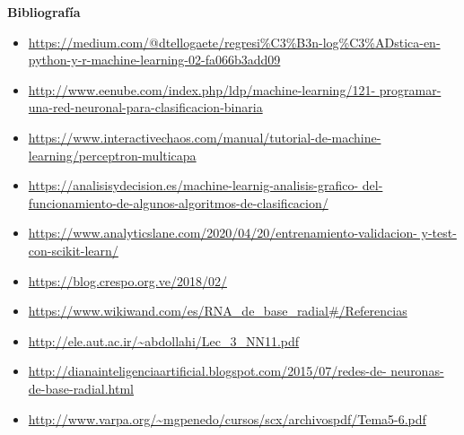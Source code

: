 \documentclass[letterpaper,11pt]{article}
\begin{document}
\textbf{Bibliografía}
\begin{itemize}
    \item \url{https://medium.com/@dtellogaete/regresi%
               python-y-r-machine-learning-02-fa066b3add09}
    \item \url{http://www.eenube.com/index.php/ldp/machine-learning/121-
               programar-una-red-neuronal-para-clasificacion-binaria}
    \item \url{https://www.interactivechaos.com/manual/tutorial-de-machine-
               learning/perceptron-multicapa}
    \item \url{https://analisisydecision.es/machine-learnig-analisis-grafico-
               del-funcionamiento-de-algunos-algoritmos-de-clasificacion/}
    \item \url{https://www.analyticslane.com/2020/04/20/entrenamiento-validacion-
               y-test-con-scikit-learn/}
    \item \url{https://blog.crespo.org.ve/2018/02/}
    \item \url{https://www.wikiwand.com/es/RNA_de_base_radial#/Referencias}
    \item \url{http://ele.aut.ac.ir/~abdollahi/Lec_3_NN11.pdf}
    \item \url{http://dianainteligenciaartificial.blogspot.com/2015/07/redes-de-
               neuronas-de-base-radial.html}
    \item \url{http://www.varpa.org/~mgpenedo/cursos/scx/archivospdf/Tema5-6.pdf}
\end{itemize}
\end{document}

